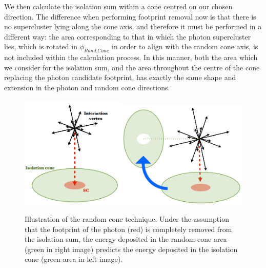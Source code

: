 We then calculate the isolation sum within a cone centred on our chosen direction. The difference when performing footprint removal now is that there is no supercluster lying along the cone axis, and therefore it must be performed in a different way: the area corresponding to that in which the photon supercluster lies, which is rotated in $\phi_{Rand.Cone}$ in order to align with the random cone axis, is not included within the calculation process. In this manner, both the area which we consider for the isolation sum, and the area throughout the centre of the cone replacing the photon candidate footprint, has exactly the same shape and extension in the photon and random cone directions.   

\begin{figure} 
\begin{center}
\includegraphics[width=0.45\textwidth]{Figures/RandomCone1.png}\includegraphics[width=0.55\textwidth]{Figures/RandomCone2.png}
\end{center}
\caption{Illustration of the random cone technique. Under the assumption that the footprint of the photon (red) is completely removed from the isolation sum, the energy deposited in the random-cone area (green in right image) predicts the energy deposited in the isolation cone (green area in left image). \cite{MarcoThesis}}
\label{fig-RandomConeIsolation}
\end{figure}

